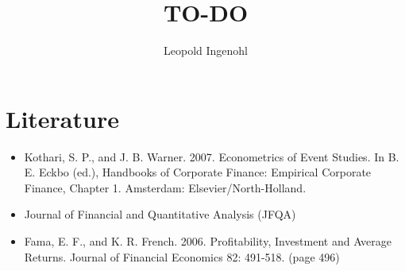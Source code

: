 \documentclass[12pt]{article}
\title{TO-DO}
\author{Leopold Ingenohl}
\begin{document}
\maketitle

\section{Literature}
\begin{itemize}
   \item Kothari, S. P., and J. B. Warner. 2007. Econometrics of Event Studies. In B. E. Eckbo (ed.), Handbooks of Corporate Finance: Empirical Corporate Finance, Chapter 1. Amsterdam: Elsevier/North-Holland.
   \item Journal of Financial and Quantitative Analysis (JFQA)
   \item Fama, E. F., and K. R. French. 2006. Profitability, Investment and Average Returns. Journal of Financial Economics 82: 491-518. (page 496)

\end{itemize}
\end{document}
